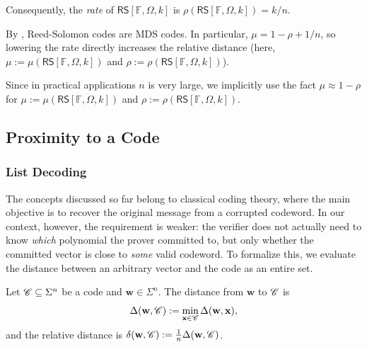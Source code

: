 \documentclass[../../book]{subfiles}
\begin{document}
Consequently, the \emph{rate} of $\mathsf{RS}[\mathbb{F},\Omega,k]$ is $\rho(\mathsf{RS}[\mathbb{F},\Omega,k]) = k/n$.

\begin{remark}
  By , Reed-Solomon codes are MDS codes. In particular,
  $\mu = 1 - \rho + 1/n$, so lowering the rate directly increases the relative distance (here, $\mu := \mu(\mathsf{RS}[\mathbb{F},\Omega,k])$ and $\rho := \rho(\mathsf{RS}[\mathbb{F},\Omega,k])$).
\end{remark}

\begin{remark}
  Since in practical applications $n$ is very large, we implicitly use the fact $\mu \approx 1-\rho$ for $\mu := \mu(\mathsf{RS}[\mathbb{F},\Omega,k])$ and $\rho := \rho(\mathsf{RS}[\mathbb{F},\Omega,k])$.
\end{remark}

\subsection{Proximity to a Code}\label{subsec:proximity}

\subsubsection{List Decoding}\label{subsubsec:list-decoding}

The concepts discussed so far belong to classical coding theory, where the main objective is to recover the original message from a corrupted codeword. In our context, however, the requirement is weaker: the verifier does not actually need to know \emph{which} polynomial the prover committed to, but only whether the committed vector is close to \emph{some} valid codeword. To formalize this, we evaluate the distance between an arbitrary vector and the code as an entire set.

\begin{definition}\label{def:dist-to-code}
    Let $\mathscr{C} \subseteq \Sigma^n$ be a code and $\mathbf{w} \in \Sigma^n$. The distance from
    $\mathbf{w}$ to $\mathscr{C}$ is
    \begin{equation*}
        \Delta(\mathbf{w}, \mathscr{C}) := \min_{\mathbf{x} \in \mathscr{C}} \Delta(\mathbf{w}, \mathbf{x}),
    \end{equation*}
    and the relative distance is $\delta(\mathbf{w}, \mathscr{C}) := \frac{1}{n}\Delta(\mathbf{w}, \mathscr{C})$.
\end{definition}
\end{document}
